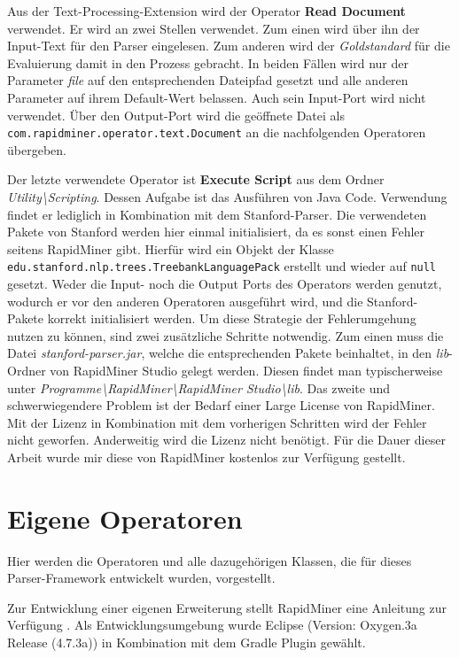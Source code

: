 Aus der Text-Processing-Extension wird der Operator \textbf{Read Document} verwendet. Er wird an zwei Stellen verwendet. Zum einen wird über ihn der Input-Text für den Parser eingelesen. Zum anderen wird der \textit{Goldstandard} für die Evaluierung damit in den Prozess gebracht. In beiden Fällen wird nur der Parameter \textit{file} auf den entsprechenden Dateipfad gesetzt und alle anderen Parameter auf ihrem Default-Wert belassen. Auch sein Input-Port wird nicht verwendet. Über den Output-Port wird die geöffnete Datei als \texttt{com.rapidminer.operator.text.Document} an die nachfolgenden Operatoren übergeben.

Der letzte verwendete Operator ist \textbf{Execute Script} aus dem Ordner \textit{Utility\textbackslash Scripting}. Dessen Aufgabe ist das Ausführen von Java Code. Verwendung findet er lediglich in Kombination mit dem Stanford-Parser. Die verwendeten Pakete von Stanford werden hier einmal initialisiert, da es sonst einen Fehler seitens RapidMiner gibt. Hierfür wird ein Objekt der Klasse  \texttt{edu.stanford.nlp.trees.TreebankLanguagePack} erstellt und wieder auf \texttt{null} gesetzt. Weder die Input- noch die Output Ports des Operators werden genutzt, wodurch er vor den anderen Operatoren ausgeführt wird, und die Stanford-Pakete korrekt initialisiert werden. Um diese Strategie der Fehlerumgehung nutzen zu können, sind zwei zusätzliche Schritte notwendig. Zum einen muss die Datei \textit{stanford-parser.jar}, welche die entsprechenden Pakete beinhaltet, in den \textit{lib}-Ordner von RapidMiner Studio gelegt werden. Diesen findet man typischerweise unter \textit{Programme\textbackslash RapidMiner\textbackslash RapidMiner Studio\textbackslash  lib}. Das zweite und schwerwiegendere Problem ist der Bedarf einer Large License von RapidMiner. Mit der Lizenz in Kombination mit dem vorherigen Schritten wird der Fehler nicht geworfen. Anderweitig wird die Lizenz nicht benötigt. Für die Dauer dieser Arbeit wurde mir diese von RapidMiner kostenlos zur Verfügung gestellt.
\section{Eigene Operatoren}
\label{sec:impl:eigene}

Hier werden die Operatoren und alle dazugehörigen Klassen, die für dieses Parser-Framework entwickelt wurden, vorgestellt. 

Zur Entwicklung einer eigenen Erweiterung stellt RapidMiner eine Anleitung zur Verfügung \cite{rmguide}. %
Als Entwicklungsumgebung wurde Eclipse (Version: Oxygen.3a Release (4.7.3a)) in Kombination mit dem Gradle Plugin  gewählt. 

